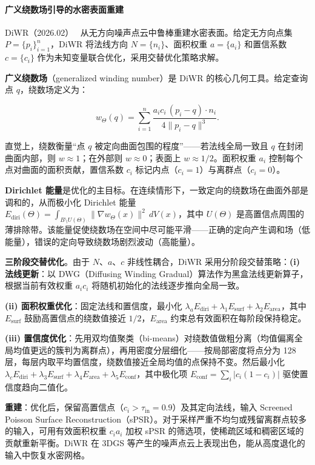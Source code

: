 \paragraph{广义绕数场引导的水密表面重建}

DiWR（2026.02）~\cite{2602_13801} 从无方向噪声点云中鲁棒重建水密表面。给定无方向点集 $P=\{p_i\}_{i=1}^{n}$，DiWR 将法线方向 $N=\{n_i\}$、面积权重 $a=\{a_i\}$ 和置信系数 $c=\{c_i\}$ 作为未知变量联合优化，采用交替优化策略求解。

\textbf{广义绕数场}（generalized winding number）是 DiWR 的核心几何工具。给定查询点 $q$，绕数场定义为：

\begin{equation*}
w_\Theta(q) = \sum_{i=1}^{n} \frac{a_i c_i\, (p_i - q) \cdot n_i}{4\|p_i - q\|^3}.
\end{equation*}

直觉上，绕数衡量“点 $q$ 被定向曲面包围的程度”——若法线全局一致且 $q$ 在封闭曲面内部，则 $w \approx 1$；在外部则 $w \approx 0$；表面上 $w \approx 1/2$。面积权重 $a_i$ 控制每个点对曲面的面积贡献，置信系数 $c_i$ 标记内点（$c_i=1$）与离群点（$c_i=0$）。

\textbf{Dirichlet 能量}是优化的主目标。在连续情形下，一致定向的绕数场在曲面外部是调和的，从而极小化 Dirichlet 能量 $E_{\text{diri}}(\Theta) = \int_{B \setminus U(\Theta)} \|\nabla w_\Theta(x)\|^2\, dV(x)$，其中 $U(\Theta)$ 是高置信点周围的薄排除带。该能量促使绕数场在空间中尽可能平滑——正确的定向产生调和场（低能量），错误的定向导致绕数场剧烈波动（高能量）。

\textbf{三阶段交替优化}。由于 $N$、$a$、$c$ 非线性耦合，DiWR 采用分阶段交替策略：\textbf{(i) 法线更新}：以 DWG（Diffusing Winding Gradual）算法作为黑盒法线更新算子，根据当前有效权重 $a_i c_i$ 将随机初始化的法线逐步推向全局一致。

\textbf{(ii) 面积权重优化}：固定法线和置信度，最小化 $\lambda_a E_{\text{diri}} + \lambda_1 E_{\text{surf}} + \lambda_2 E_{\text{area}}$，其中 $E_{\text{surf}}$ 鼓励高置信点的绕数值接近 $1/2$，$E_{\text{area}}$ 约束总有效面积在每阶段保持稳定。

\textbf{(iii) 置信度优化}：先用双均值聚类（bi-means）对绕数值做粗分离（均值偏离全局均值更远的簇判为离群点），再用密度分层细化——按局部密度将点分为 128 层，每层内取平均置信度，绕数值接近全局均值的点保持不变。然后最小化 $\lambda_c E_{\text{diri}} + \lambda_3 E_{\text{surf}} + \lambda_4 E_{\text{area}} + \lambda_5 E_{\text{conf}}$，其中极化项 $E_{\text{conf}} = \sum_{i} |c_i(1-c_i)|$ 驱使置信度趋向二值化。

\textbf{重建}：优化后，保留高置信点（$c_i > \tau_{\text{in}}=0.9$）及其定向法线，输入 Screened Poisson Surface Reconstruction（sPSR）。对于采样严重不均匀或残留离群点较多的输入，可用有效面积权重 $c_i a_i$ 加权 sPSR 的筛选项，使稀疏区域和稠密区域的贡献重新平衡。DiWR 在 3DGS 等产生的噪声点云上表现出色，能从高度退化的输入中恢复水密网格。

